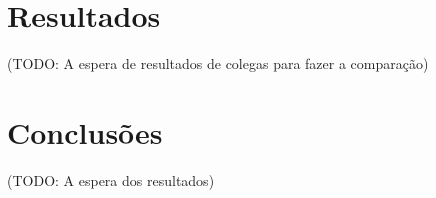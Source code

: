 \documentclass{llncs}
\begin{document}
\section{Resultados}

(TODO: A espera de resultados de colegas para fazer a compara\c{c}ão)

\section{Conclus\~{o}es}

(TODO: A espera dos resultados)
\end{document}

